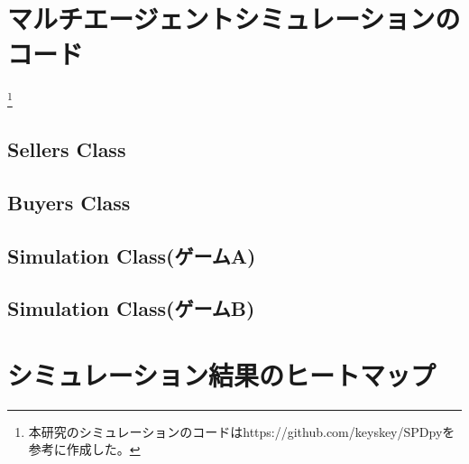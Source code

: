 \documentclass[a4paper,fontsize=11pt,report,notitlepage,line_length=38zw,number_of_lines=40,dvipdfmx]{jlreq}
\begin{document}
\appendix
\chapter{マルチエージェントシミュレーションのコード}
\footnote{本研究のシミュレーションのコードはhttps://github.com/keyskey/SPDpyを参考に作成した。}
\section{Sellers Class}
\section{Buyers Class}
\section{Simulation Class(ゲームA)}
\section{Simulation Class(ゲームB)}


\chapter{シミュレーション結果のヒートマップ}
\end{document}

